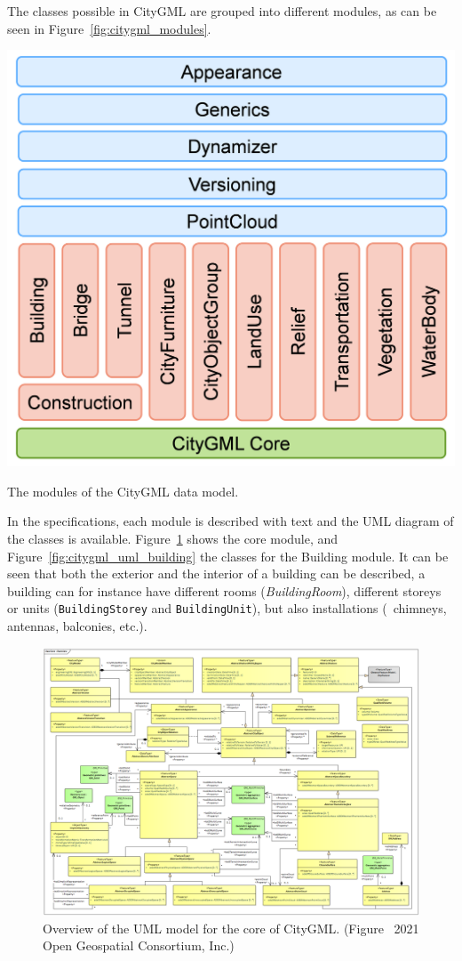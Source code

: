 The classes possible in CityGML are grouped into different modules, as can be seen in Figure~\ref{fig:citygml_modules}.
\begin{marginfigure}
  \centering
  \includegraphics[width=\linewidth]{figs/citygml_modules.png}
  \caption{The modules of the CityGML data model.}%
\label{fig:citygml_modules}
\end{marginfigure}
In the specifications, each module is described with text and the UML diagram of the classes is available.
Figure~\ref{fig:citygml_uml_core} shows the core module, and Figure~\ref{fig:citygml_uml_building} the classes for the Building module.
It can be seen that both the exterior and the interior of a building can be described, a building can for instance have different rooms (\emph{BuildingRoom}), different storeys or units (\texttt{BuildingStorey} and \texttt{BuildingUnit}), but also installations (\eg\ chimneys, antennas, balconies, etc.).
\begin{figure}
  \centering
  \includegraphics[width=0.95\linewidth]{figs/citygml_uml_core}
  \caption{Overview of the UML model for the core of CityGML\@. (Figure \textcopyright\ 2021 Open Geospatial Consortium, Inc.)}%
\label{fig:citygml_uml_core}
\end{figure}
